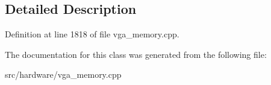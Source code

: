 \subsection{Detailed Description}


Definition at line 1818 of file vga\-\_\-memory.\-cpp.



The documentation for this class was generated from the following file\-:\begin{DoxyCompactItemize}
\item 
src/hardware/vga\-\_\-memory.\-cpp\end{DoxyCompactItemize}
